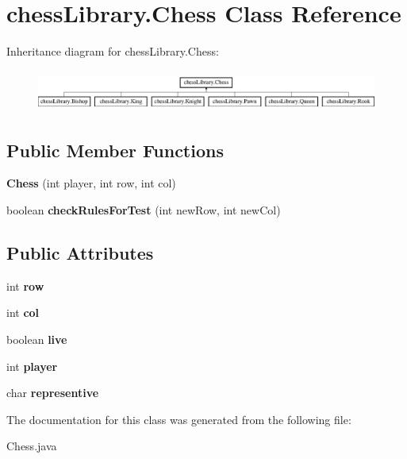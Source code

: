 \hypertarget{classchess_library_1_1_chess}{}\section{chess\+Library.\+Chess Class Reference}
\label{classchess_library_1_1_chess}
Inheritance diagram for chess\+Library.\+Chess\+:\begin{figure}[H]
\begin{center}
\leavevmode
\includegraphics[height=1.372549cm]{classchess_library_1_1_chess}
\end{center}
\end{figure}
\subsection*{Public Member Functions}
\begin{DoxyCompactItemize}
\item 
\mbox{\label{classchess_library_1_1_chess_a367823db5e0010dbc686f2589b5c3039}} 
{\bfseries Chess} (int player, int row, int col)
\item 
\mbox{\label{classchess_library_1_1_chess_a25fce16618d281a89acd51b824445396}} 
boolean {\bfseries check\+Rules\+For\+Test} (int new\+Row, int new\+Col)
\end{DoxyCompactItemize}
\subsection*{Public Attributes}
\begin{DoxyCompactItemize}
\item 
\mbox{\label{classchess_library_1_1_chess_a2829345d8d3f38e26cecef4ab77919d6}} 
int {\bfseries row}
\item 
\mbox{\label{classchess_library_1_1_chess_a9c322dd6bd9d2cee433c82bdf876b3e8}} 
int {\bfseries col}
\item 
\mbox{\label{classchess_library_1_1_chess_a2acefc2906f93c0da9aa3078a04e4c56}} 
boolean {\bfseries live}
\item 
\mbox{\label{classchess_library_1_1_chess_a12759455cdf23360e8ecbd45ac81ca88}} 
int {\bfseries player}
\item 
\mbox{\label{classchess_library_1_1_chess_aad63de67e59fea708fe96532f9a615f2}} 
char {\bfseries representive}
\end{DoxyCompactItemize}


The documentation for this class was generated from the following file\+:\begin{DoxyCompactItemize}
\item 
Chess.\+java\end{DoxyCompactItemize}
